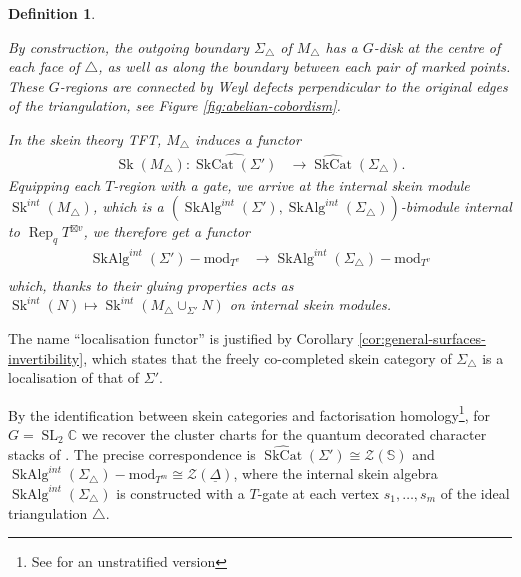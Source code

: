 \documentclass[a4paper]{article}
\numberwithin{equation}{section}
\newtheorem{definition}[counter]{Definition}
\newcommand{\1}{{\mathrm{1}\mkern-4mu{\mathchoice{}{}{\mskip-0.5mu}{\mskip-1mu}}\mathrm{l}}}
\newcommand{\CC}{\mathbb{C}}
\DeclareMathOperator{\Rep}{Rep}
\DeclareMathOperator{\SL}{SL}
\renewcommand{\mod}{\mathrm{mod}}
\DeclareMathOperator{\Sk}{Sk}
\DeclareMathOperator{\SkCat}{SkCat}
\DeclareMathOperator{\SkAlg}{SkAlg}
\begin{document}
\begin{definition}
\begin{description}
By construction, the outgoing boundary $\Sigma_\triangle$ of $M_{\triangle}$ has a $G$-disk at the centre of each face of $\triangle$, as well as along the boundary between each pair of marked points.
These $G$-regions are connected by Weyl defects perpendicular to the original edges of the triangulation, see Figure \ref{fig:abelian-cobordism}.

\item[Step 3: Skein Functor]
 In the skein theory TFT, $M_\triangle$ induces a functor
\begin{equation}
  \begin{aligned}
    \Sk(M_\triangle) : \widehat{\SkCat(\Sigma')} &\to \widehat{\SkCat}(\Sigma_\triangle).
  \end{aligned}
\end{equation}
Equipping each $T$-region with a gate, we arrive at the internal skein module $\Sk^{int}(M_\triangle)$, which is a $(\SkAlg^{int}(\Sigma'), \SkAlg^{int}(\Sigma_\triangle))$-bimodule internal to $\Rep_qT^{\boxtimes v}$, we therefore get a functor
\begin{equation}
    \begin{aligned}
        \SkAlg^{int}(\Sigma')-\mod_{T^v} &\to \SkAlg^{int}(\Sigma_\triangle)-\mod_{T^v} \\
    \end{aligned}
\end{equation}
which, thanks to their gluing properties acts as $\Sk^{int}(N) \mapsto \Sk^{int}(M_\triangle \cup_{\Sigma'}N)$ on internal skein modules. 
\end{description}
\end{definition}

The name ``localisation functor'' is justified by Corollary \ref{cor:general-surfaces-invertibility}, which states that the freely co-completed skein category of $\Sigma_\triangle$ is a localisation of that of $\Sigma'$.

By the identification between skein categories and factorisation homology\footnote{See \cite{Cooke2019,Brown_Haioun_2026} for an unstratified version}, for $G=\SL_2\CC$ we recover the cluster charts for the quantum decorated character stacks of \cite{JLSS2021}. The precise correspondence is $\widehat{\SkCat}(\Sigma') \cong \mathcal{Z}(\mathbb{S})$ and $\SkAlg^{int}(\Sigma_\triangle)-\mod_{T^m} \cong \mathcal{Z}(\underline{\Delta})$, where the internal skein algebra $\SkAlg^{int}(\Sigma_\triangle)$ is constructed with a $T$-gate at each vertex $s_1,\ldots,s_m$ of the ideal triangulation $\triangle$.
\end{document}
